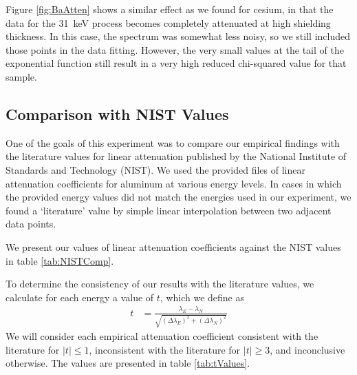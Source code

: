 \documentclass[letter]{article}
\begin{document}
Figure \ref{fig:BaAtten} shows a similar effect as we found for cesium, in that the data for the \qty{31}{\kilo\electronvolt} process becomes completely attenuated at high shielding thickness. In this case, the spectrum was somewhat less noisy, so we still included those points in the data fitting. However, the very small values at the tail of the exponential function still result in a very high reduced chi-squared value for that sample.


\subsection{Comparison with NIST Values}

One of the goals of this experiment was to compare our empirical findings with the literature values for linear attenuation published by the National Institute of Standards and Technology (NIST). We used the provided files of linear attenuation coefficients for aluminum at various energy levels. In cases in which the provided energy values did not match the energies used in our experiment, we found a `literature' value by simple linear interpolation between two adjacent data points.

We present our values of linear attenuation coefficients against the NIST values in table \ref{tab:NISTComp}.


To determine the consistency of our results with the literature values, we calculate for each energy a value of $t$, which we define as
\begin{align}
t
&=
\frac{\lambda_E - \lambda_N}{\sqrt{ (\Delta \lambda_E)^2 + (\Delta \lambda_N)^2 }}
\end{align}
We will consider each empirical attenuation coefficient consistent with the literature for $|t| \leq 1$, inconsistent with the literature for $|t| \geq 3$, and inconclusive otherwise. The values are presented in table \ref{tab:tValues}.
\end{document}
